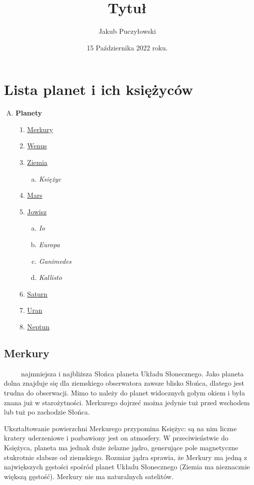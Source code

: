 \documentclass[12pt, letterpaper, titlepage]{article}
\title{Tytuł}
\author{Jakub Puczyłowski}
\date{15 Października 2022 roku.}
\begin{document}
\maketitle
\section{Lista planet i ich księżyców}
\begin{enumerate}[A)]
\item \textbf {Planety}
\begin{enumerate}[1.]
\item \underline{Merkury} 
\item \underline{Wenus} 
\item \underline{Ziemia} 
\begin{enumerate}[a)]
\item \textit{Księżyc}
\end{enumerate}
\item \underline{Mars} 
\item \underline{Jowisz} 
\begin{enumerate}[a)]
\item \textit{Io}
\item \textit{Europa}
\item \textit{Ganimedes}
\item \textit{Kallisto}
\end{enumerate}
\item \underline{Saturn} 
\item \underline{Uran} 
\item \underline{Neptun} 
\end{enumerate}
\end{enumerate}
\newpage
\subsection{Merkury}
\ \ \ \ \ najmniejsza i najbliższa Słońca planeta Układu Słonecznego. Jako planeta dolna znajduje się dla ziemskiego obserwatora zawsze blisko Słońca, dlatego jest trudna do obserwacji. Mimo to należy do planet widocznych gołym okiem i była znana już w starożytności. Merkurego dojrzeć można jedynie tuż przed wschodem lub tuż po zachodzie Słońca.

Ukształtowanie powierzchni Merkurego przypomina Księżyc: są na nim liczne kratery uderzeniowe i pozbawiony jest on atmosfery. W przeciwieństwie do Księżyca, planeta ma jednak duże żelazne jądro, generujące pole magnetyczne stukrotnie słabsze od ziemskiego. Rozmiar jądra sprawia, że Merkury ma jedną z największych gęstości spośród planet Układu Słonecznego (Ziemia ma nieznacznie większą gęstość). Merkury nie ma naturalnych satelitów.
\end{document}
